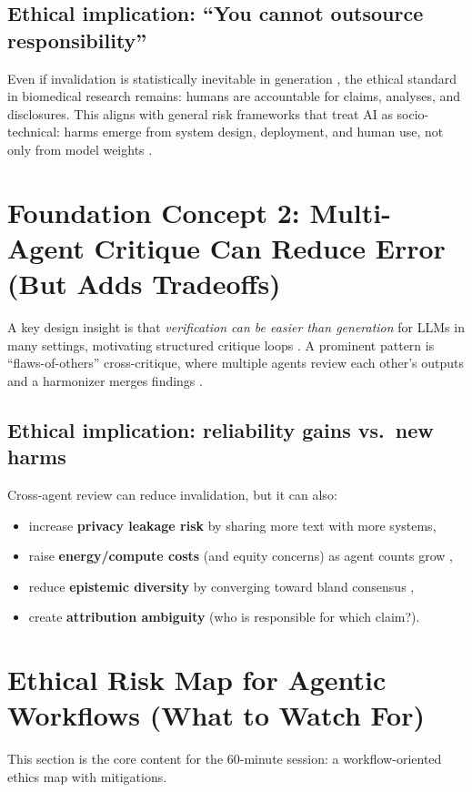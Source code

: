 \documentclass[11pt]{article}
\begin{document}
\subsection{Ethical implication: ``You cannot outsource responsibility''}
Even if invalidation is statistically inevitable in generation \citep{gutierrez2025}, the ethical standard in biomedical research remains: humans are accountable for claims, analyses, and disclosures. This aligns with general risk frameworks that treat AI as socio-technical: harms emerge from system design, deployment, and human use, not only from model weights \citep{nist_rmf}.

\section{Foundation Concept 2: Multi-Agent Critique Can Reduce Error (But Adds Tradeoffs)}
A key design insight is that \emph{verification can be easier than generation} for LLMs in many settings, motivating structured critique loops \citep{gutierrez2025}. A prominent pattern is ``flaws-of-others'' cross-critique, where multiple agents review each other's outputs and a harmonizer merges findings \citep{gutierrez2025}.

\subsection{Ethical implication: reliability gains vs.\ new harms}
Cross-agent review can reduce invalidation, but it can also:
\begin{itemize}
\item increase \textbf{privacy leakage risk} by sharing more text with more systems,
\item raise \textbf{energy/compute costs} (and equity concerns) as agent counts grow \citep{strubell2019},
\item reduce \textbf{epistemic diversity} by converging toward bland consensus \citep{bender2021},
\item create \textbf{attribution ambiguity} (who is responsible for which claim?).
\end{itemize}

\section{Ethical Risk Map for Agentic Workflows (What to Watch For)}
This section is the core content for the 60-minute session: a workflow-oriented ethics map with mitigations.
\end{document}
